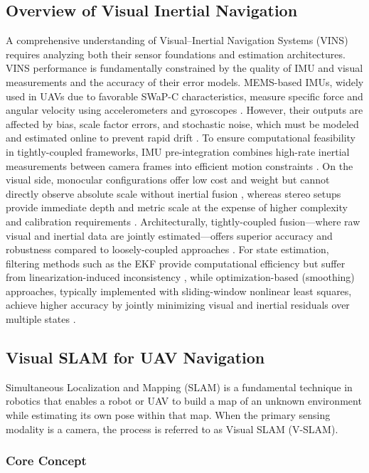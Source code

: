 \subsection{Overview of Visual Inertial Navigation}
A comprehensive understanding of Visual–Inertial Navigation Systems (VINS) requires analyzing both their sensor foundations and estimation architectures. VINS performance is fundamentally constrained by the quality of IMU and visual measurements and the accuracy of their error models. MEMS-based IMUs, widely used in UAVs due to favorable SWaP-C characteristics, measure specific force and angular velocity using accelerometers and gyroscopes \cite{ref21}. However, their outputs are affected by bias, scale factor errors, and stochastic noise, which must be modeled and estimated online to prevent rapid drift \cite{ref21,ref23,ref24}. To ensure computational feasibility in tightly-coupled frameworks, IMU pre-integration combines high-rate inertial measurements between camera frames into efficient motion constraints \cite{ref20}. On the visual side, monocular configurations offer low cost and weight but cannot directly observe absolute scale without inertial fusion \cite{ref26,ref27}, whereas stereo setups provide immediate depth and metric scale at the expense of higher complexity and calibration requirements \cite{ref25,ref27}. Architecturally, tightly-coupled fusion—where raw visual and inertial data are jointly estimated—offers superior accuracy and robustness compared to loosely-coupled approaches \cite{ref28,ref29,ref30}. For state estimation, filtering methods such as the EKF provide computational efficiency but suffer from linearization-induced inconsistency \cite{openvins,orbslam3,cuvslam}, while optimization-based (smoothing) approaches, typically implemented with sliding-window nonlinear least squares, achieve higher accuracy by jointly minimizing visual and inertial residuals over multiple states \cite{ref30,openvins,qvio}.

\subsection{Visual SLAM for UAV Navigation}

Simultaneous Localization and Mapping (SLAM) is a fundamental technique in robotics that enables a robot or UAV to build a map of an unknown environment while estimating its own pose within that map. When the primary sensing modality is a camera, the process is referred to as Visual SLAM (V-SLAM).

\subsubsection{Core Concept}

